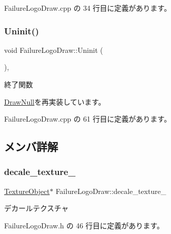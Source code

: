  Failure\+Logo\+Draw.\+cpp の 34 行目に定義があります。

\mbox{\label{class_failure_logo_draw_a97646253380b54f37565650e211f33cd}} 
\subsubsection{\texorpdfstring{Uninit()}{Uninit()}}
{\footnotesize\ttfamily void Failure\+Logo\+Draw\+::\+Uninit (\begin{DoxyParamCaption}{ }\end{DoxyParamCaption})\hspace{0.3cm}{\ttfamily [override]}, {\ttfamily [virtual]}}



終了関数 



\mbox{\hyperlink{class_draw_null_a12d44e341c7364b5ab9cdd661dc16187}{Draw\+Null}}を再実装しています。



 Failure\+Logo\+Draw.\+cpp の 61 行目に定義があります。



\subsection{メンバ詳解}
\mbox{\label{class_failure_logo_draw_a02463e67fa2053739c667bb1213e1b9e}} 
\subsubsection{\texorpdfstring{decale\+\_\+texture\+\_\+}{decale\_texture\_}}
{\footnotesize\ttfamily \mbox{\hyperlink{class_texture_object}{Texture\+Object}}$\ast$ Failure\+Logo\+Draw\+::decale\+\_\+texture\+\_\+\hspace{0.3cm}{\ttfamily [private]}}



デカールテクスチャ 



 Failure\+Logo\+Draw.\+h の 46 行目に定義があります。

